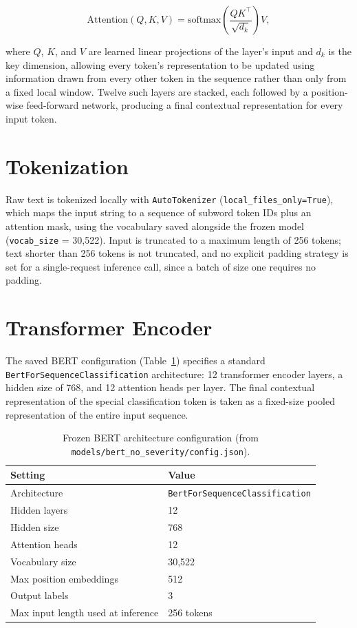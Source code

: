 \begin{equation}
\mathrm{Attention}(Q, K, V) = \mathrm{softmax}\!\left(\frac{QK^\top}{\sqrt{d_k}}\right)V,
\end{equation}

where $Q$, $K$, and $V$ are learned linear projections of the layer's input and $d_k$ is the key dimension, allowing every token's representation to be updated using information drawn from every other token in the sequence rather than only from a fixed local window. Twelve such layers are stacked, each followed by a position-wise feed-forward network, producing a final contextual representation for every input token.

\section{Tokenization}

Raw text is tokenized locally with \texttt{AutoTokenizer} (\texttt{local\_\pbrk files\_\pbrk only=True}), which maps the input string to a sequence of subword token IDs plus an attention mask, using the vocabulary saved alongside the frozen model (\texttt{vocab\_size} = 30{,}522). Input is truncated to a maximum length of 256 tokens; text shorter than 256 tokens is not truncated, and no explicit padding strategy is set for a single-request inference call, since a batch of size one requires no padding.

\section{Transformer Encoder}

The saved BERT configuration (Table~\ref{tab:bert-config}) specifies a standard \texttt{BertForSequenceClassification} architecture: 12 transformer encoder layers, a hidden size of 768, and 12 attention heads per layer. The final contextual representation of the special classification token is taken as a fixed-size pooled representation of the entire input sequence.

\begin{table}[H]
\centering
\caption{Frozen BERT architecture configuration (from \texttt{models/\pbrk bert\_\pbrk no\_\pbrk severity/\pbrk config.json}).}
\label{tab:bert-config}
\begin{tabular}{ll}
\toprule
\textbf{Setting} & \textbf{Value} \\
\midrule
Architecture & \texttt{BertForSequenceClassification} \\
Hidden layers & 12 \\
Hidden size & 768 \\
Attention heads & 12 \\
Vocabulary size & 30{,}522 \\
Max position embeddings & 512 \\
Output labels & 3 \\
Max input length used at inference & 256 tokens \\
\bottomrule
\end{tabular}
\end{table}

